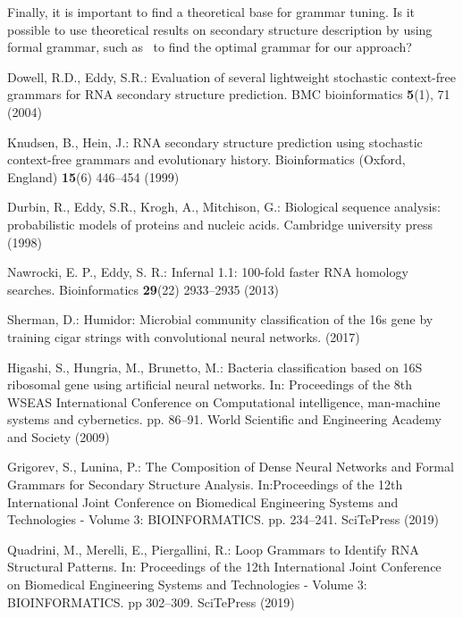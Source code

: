 \documentclass[runningheads]{llncs}
\begin{document}
Finally, it is important to find a theoretical base for grammar tuning.
Is it possible to use theoretical results on secondary structure description by using formal grammar, such as~\cite{MQbioinformatics19} to find the optimal grammar for our approach?
%
%
%
% 
% 
%
\begin{thebibliography}{14}

Dowell, R.D., Eddy, S.R.: Evaluation of several lightweight stochastic context-free grammars for RNA secondary structure prediction. BMC bioinformatics \textbf{5}(1), 71 (2004)

Knudsen, B., Hein, J.: RNA secondary structure prediction using stochastic context-free grammars and evolutionary history. Bioinformatics (Oxford, England) \textbf{15}(6) 446--454 (1999)

Durbin, R., Eddy, S.R., Krogh, A., Mitchison, G.: Biological sequence analysis: probabilistic models of proteins and nucleic acids. Cambridge university press (1998)

Nawrocki, E. P., Eddy, S. R.: Infernal 1.1: 100-fold faster RNA homology searches. Bioinformatics \textbf{29}(22) 2933--2935 (2013)

Sherman, D.: Humidor: Microbial community classification of the 16s gene by training cigar strings with convolutional neural networks. (2017)

Higashi, S., Hungria, M., Brunetto, M.: Bacteria classification based on 16S ribosomal gene using artificial neural networks. In: Proceedings of the 8th WSEAS International Conference on Computational intelligence, man-machine systems and cybernetics. pp. 86--91. World Scientific and Engineering Academy and Society (2009)

Grigorev, S., Lunina, P.: The Composition of Dense Neural Networks and Formal Grammars for Secondary Structure Analysis. In:Proceedings of the 12th International Joint Conference on Biomedical Engineering Systems and Technologies - Volume 3: BIOINFORMATICS. pp. 234--241. SciTePress (2019)

Quadrini, M., Merelli, E., Piergallini, R.: Loop Grammars to Identify RNA Structural Patterns. In: Proceedings of the 12th International Joint Conference on Biomedical Engineering Systems and Technologies - Volume 3: BIOINFORMATICS. pp 302--309. SciTePress (2019)


\end{thebibliography}
\end{document}
